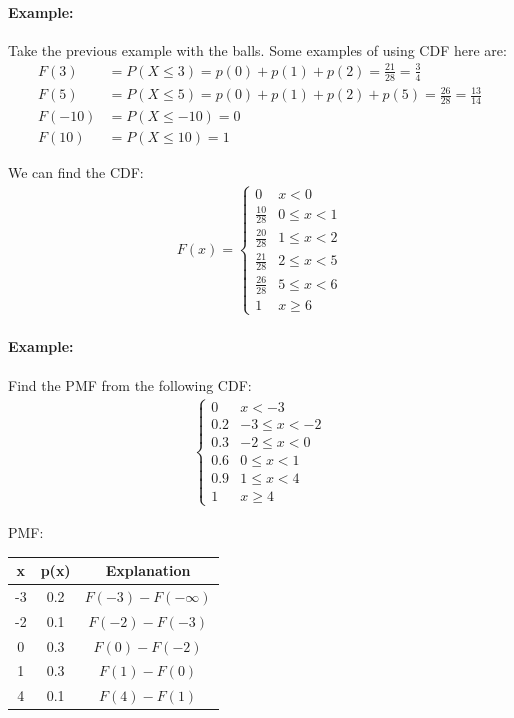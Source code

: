 \paragraph*{Example:}
Take the previous example with the balls. Some examples of using CDF here are:
\begin{align*}
    F(3) &= P(X \leq 3) = p(0) + p(1) + p(2) = \frac{21}{28} = \frac{3}{4} \\
    F(5) &= P(X \leq 5) = p(0) + p(1) + p(2) + p(5) = \frac{26}{28} = \frac{13}{14} \\
    F(-10) &= P(X \leq -10) = 0 \\
    F(10) &= P(X \leq 10) = 1
\end{align*}

We can find the CDF:
\begin{align*}
    F(x) = 
    \begin{cases}
        0 & x < 0 \\
        \frac{10}{28} & 0 \leq x < 1 \\
        \frac{20}{28} & 1 \leq x < 2 \\
        \frac{21}{28} & 2 \leq x < 5 \\
        \frac{26}{28} & 5 \leq x < 6 \\
        1 & x \geq 6
    \end{cases}
\end{align*}

\paragraph*{Example:}
Find the PMF from the following CDF:
\begin{align*}
    \begin{cases}
    0 & x < -3 \\
    0.2 & -3 \leq x < -2 \\
    0.3 & -2 \leq x < 0 \\
    0.6 & 0 \leq x < 1 \\
    0.9 & 1 \leq x < 4 \\
    1 & x \geq 4
    \end{cases}
\end{align*}

PMF:

\begin{table}[h!]
    \centering
    \begin{tabular}{c|c|c}
        x & p(x) & Explanation \\
        \hline
        -3 & 0.2 & $F(-3) - F(-\infty)$ \\
        \hline
        -2 & 0.1 & $F(-2) - F(-3)$ \\
        \hline
        0 & 0.3 & $F(0) - F(-2)$ \\
        \hline
        1 & 0.3 & $F(1) - F(0)$ \\
        \hline
        4 & 0.1 & $F(4) - F(1)$ \\
        \hline
    \end{tabular}
\end{table}